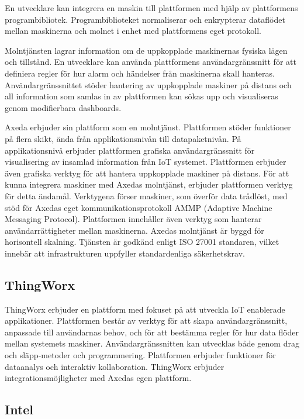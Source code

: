 En utvecklare kan integrera en maskin till plattformen med hjälp av plattformens
programbibliotek. Programbiblioteket normaliserar och enkrypterar
dataflödet mellan maskinerna och molnet i enhet med plattformens eget
protokoll.

Molntjänsten lagrar information om de uppkopplade maskinernas fysiska lägen och
tillstånd. En utvecklare kan använda plattformens användargränssnitt för att
definiera regler för hur alarm och händelser från maskinerna skall hanteras.
Användargränssnittet stöder hantering av uppkopplade maskiner på distans och
all information som samlas in av plattformen kan sökas upp och visualiseras
genom modifierbara dashboards.




Axeda erbjuder sin plattform som en molntjänst. Plattformen stöder 
funktioner på flera skikt, ända från applikationsnivån till datapaketnivån.
På applikationsnivå erbjuder plattformen grafiska användargränssnitt för
visualisering av insamlad information från IoT systemet. Plattformen erbjuder
även grafiska verktyg för att hantera uppkopplade maskiner på distans.
För att kunna integrera maskiner med Axedas molntjänst, erbjuder plattformen 
verktyg för detta ändamål. Verktygena förser maskiner, som överför data 
trådlöst, med stöd för Axedas eget kommunikationsprotokoll AMMP 
(Adaptive Machine Messaging Protocol). Plattformen innehåller även verktyg
som hanterar användarrättigheter mellan maskinerna.
Axedas molntjänst är byggd för horisontell skalning. Tjänsten är godkänd
enligt ISO 27001 standaren, vilket innebär att infrastrukturen uppfyller
standardenliga säkerhetskrav. 

\subsection{ThingWorx}
ThingWorx erbjuder en plattform med fokuset på att utveckla IoT enablerade
applikationer. Plattformen består av verktyg för att skapa användargränssnitt,
anpassade till användarnas behov, och för att bestämma regler för hur
data flöder mellan systemets maskiner. Användargränssnitten kan utvecklas
både genom drag och släpp-metoder och programmering.
Plattformen erbjuder funktioner för dataanalys och interaktiv kollaboration.
ThingWorx erbjuder integrationsmöjligheter med Axedas egen plattform.


\subsection{Intel}

